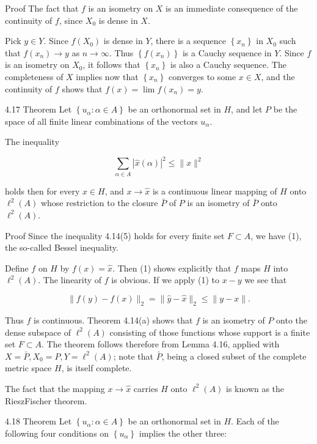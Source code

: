 \documentclass[10pt]{article}
\begin{document}
Proof The fact that $f$ is an isometry on $X$ is an immediate consequence of the continuity of $f$, since $X_{0}$ is dense in $X$.

Pick $y \in Y$. Since $f\left(X_{0}\right)$ is dense in $Y$, there is a sequence $\left\{x_{n}\right\}$ in $X_{0}$ such that $f\left(x_{n}\right) \rightarrow y$ as $n \rightarrow \infty$. Thus $\left\{f\left(x_{n}\right)\right\}$ is a Cauchy sequence in $Y$. Since $f$ is an isometry on $X_{0}$, it follows that $\left\{x_{n}\right\}$ is also a Cauchy sequence. The completeness of $X$ implies now that $\left\{x_{n}\right\}$ converges to some $x \in X$, and the continuity of $f$ shows that $f(x)=\lim f\left(x_{n}\right)=y$.

4.17 Theorem Let $\left\{u_{\alpha}: \alpha \in A\right\}$ be an orthonormal set in $H$, and let $P$ be the space of all finite linear combinations of the vectors $u_{\alpha}$.

The inequality

$$
\sum_{\alpha \in A}|\hat{x}(\alpha)|^{2} \leq\|x\|^{2}
$$

holds then for every $x \in H$, and $x \rightarrow \hat{x}$ is a continuous linear mapping of $H$ onto $\ell^{2}(A)$ whose restriction to the closure $\bar{P}$ of $P$ is an isometry of $\bar{P}$ onto $\ell^{2}(A)$.

Proof Since the inequality 4.14(5) holds for every finite set $F \subset A$, we have (1), the so-called Bessel inequality.

Define $f$ on $H$ by $f(x)=\hat{x}$. Then (1) shows explicitly that $f$ maps $H$ into $\ell^{2}(A)$. The linearity of $f$ is obvious. If we apply (1) to $x-y$ we see that

$$
\|f(y)-f(x)\|_{2}=\|\hat{y}-\hat{x}\|_{2} \leq\|y-x\| .
$$

Thus $f$ is continuous. Theorem 4.14(a) shows that $f$ is an isometry of $P$ onto the dense subspace of $\ell^{2}(A)$ consisting of those functions whose support is a finite set $F \subset A$. The theorem follows therefore from Lemma 4.16, applied with $X=\bar{P}, X_{0}=P, Y=\ell^{2}(A)$; note that $\bar{P}$, being a closed subset of the complete metric space $H$, is itself complete.

The fact that the mapping $x \rightarrow \hat{x}$ carries $H$ onto $\ell^{2}(A)$ is known as the RieszFischer theorem.

4.18 Theorem Let $\left\{u_{\alpha}: \alpha \in A\right\}$ be an orthonormal set in $H$. Each of the following four conditions on $\left\{u_{\alpha}\right\}$ implies the other three:
\end{document}
